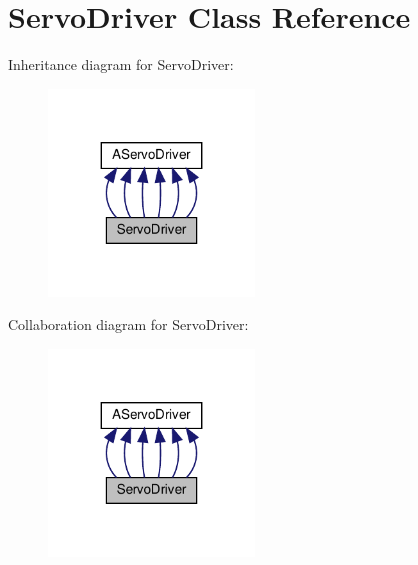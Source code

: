 \hypertarget{classServoDriver}{}\section{Servo\+Driver Class Reference}
\label{classServoDriver}


Inheritance diagram for Servo\+Driver\+:
\nopagebreak
\begin{figure}[H]
\begin{center}
\leavevmode
\includegraphics[width=155pt]{classServoDriver__inherit__graph}
\end{center}
\end{figure}


Collaboration diagram for Servo\+Driver\+:
\nopagebreak
\begin{figure}[H]
\begin{center}
\leavevmode
\includegraphics[width=155pt]{classServoDriver__coll__graph}
\end{center}
\end{figure}
